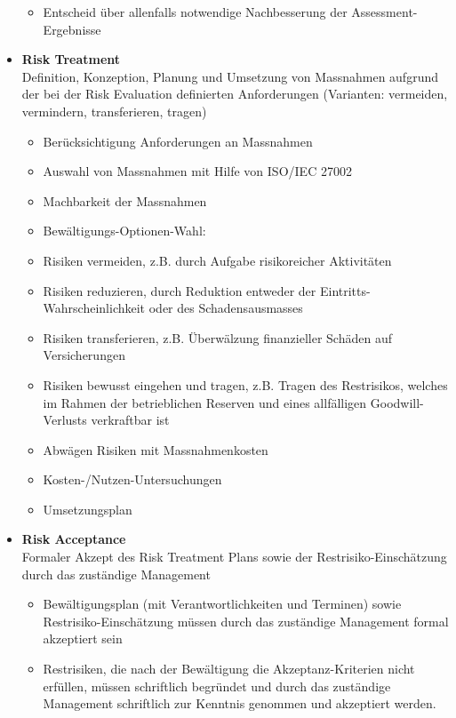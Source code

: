 \documentclass[10pt,a4paper]{article}
\begin{document}
\begin{itemize}[noitemsep,topsep=0pt,leftmargin=*]
\begin{itemize}[noitemsep,topsep=0pt,leftmargin=*]
        \item Entscheid über allenfalls notwendige Nachbesserung der Assessment-Ergebnisse
    \end{itemize}
    \item \textbf{Risk Treatment}\\Definition, Konzeption, Planung und Umsetzung von Massnahmen aufgrund der bei der Risk Evaluation definierten Anforderungen (Varianten: vermeiden, vermindern, transferieren, tragen)
    \begin{itemize}[noitemsep,topsep=0pt,leftmargin=*]
        \item Berücksichtigung Anforderungen an Massnahmen
        \item Auswahl von Massnahmen mit Hilfe von ISO/IEC 27002
        \item Machbarkeit der Massnahmen
        \item Bewältigungs-Optionen-Wahl:
        \item Risiken vermeiden, z.B. durch Aufgabe risikoreicher Aktivitäten
        \item Risiken reduzieren, durch Reduktion entweder der Eintritts-Wahrscheinlichkeit oder des Schadensausmasses
        \item Risiken transferieren, z.B. Überwälzung finanzieller Schäden auf Versicherungen
        \item Risiken bewusst eingehen und tragen,  z.B. Tragen des Restrisikos, welches im Rahmen der betrieblichen Reserven und eines allfälligen Goodwill-Verlusts verkraftbar ist
        \item Abwägen Risiken mit Massnahmenkosten
        \item Kosten-/Nutzen-Untersuchungen
        \item Umsetzungsplan
    \end{itemize}
    \item \textbf{Risk Acceptance}\\Formaler Akzept des Risk Treatment Plans sowie der Restrisiko-Einschätzung durch das zuständige Management
    \begin{itemize}[noitemsep,topsep=0pt,leftmargin=*]
        \item Bewältigungsplan (mit Verantwortlichkeiten und Terminen) sowie Restrisiko-Einschätzung müssen durch das zuständige Management formal akzeptiert sein
        \item Restrisiken, die nach der Bewältigung die Akzeptanz-Kriterien nicht erfüllen, müssen schriftlich begründet und durch das zuständige Management schriftlich zur Kenntnis genommen und akzeptiert werden.

\end{itemize}
\end{itemize}
\end{document}
